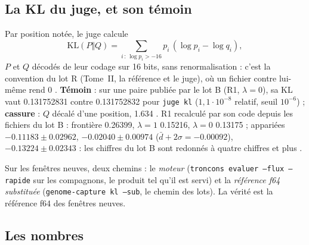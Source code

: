 \subsection{La KL du juge, et son témoin}\label{t3jug:sec:kljuge}

Par position notée, le juge calcule
\[
\mathrm{KL}(P \Vert Q) = \sum_{i \,:\, \log p_i > -16} p_i\,(\log p_i - \log q_i),
\]
$P$ et $Q$ décodés de leur codage sur 16 bits, sans renormalisation : c'est la convention du lot R (Tome~II, la référence et le juge), où un fichier contre lui-même rend 0 \parencite{kullback1951}. \textbf{Témoin} : sur une paire publiée par le lot B (R1, $\lambda = 0$), sa KL vaut \num{0.131752831} contre \num{0.131752832} pour \texttt{juge kl} ($1{,}1 \cdot 10^{-8}$ relatif, seuil $10^{-6}$) ; \textbf{cassure} : $Q$ décalé d'une position, \num{1.634} \mes. R1 recalculé par son code depuis les fichiers du lot B : frontière \num{0.26399}, $\lambda = 1$ \num{0.15216}, $\lambda = 0$ \num{0.13175} ; appariées $-\num{0.11183} \pm \num{0.02962}$, $-\num{0.02040} \pm \num{0.00974}$ ($\bar d + 2\sigma = -\num{0.00092}$), $-\num{0.13224} \pm \num{0.02343}$ : les chiffres du lot B sont redonnés à quatre chiffres et plus \mes.

Sur les fenêtres neuves, deux chemins : le \emph{moteur} (\texttt{troncons evaluer --flux --rapide} sur les compagnons, le produit tel qu'il est servi) et la \emph{référence f64 substituée} (\texttt{genome-capture kl --sub}, le chemin des lots). La vérité est la référence f64 des fenêtres neuves.

\subsection{Les nombres}\label{t3jug:sec:klnombres}

